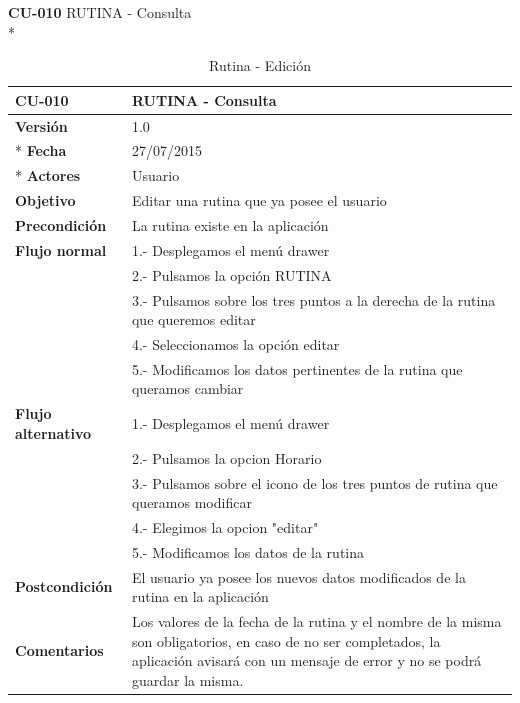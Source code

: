 \documentclass[../pfc.tex]{subfiles}
\begin{document}
		
		
		
	\textbf{CU-010}	RUTINA - Consulta\\*
		
		\begin{table}[H]
			\centering
			\begin{tabular}[t]{|p{3cm}|p{9.5cm}|}
				\hline \textbf{CU-010} & \textbf{RUTINA - Consulta} \\*
				\hline\hline \textbf{Versión} & 1.0 \\ *
				\hline\hline \textbf{Fecha} & 27/07/2015 \\ *
				\hline\textbf{Actores} 	& Usuario\\*
				\hline \textbf{Objetivo} & Editar una rutina que ya posee el usuario\\* 			
				\hline \textbf{Precondición} & La rutina existe en la aplicación\\* 
				\hline \textbf{Flujo normal} & 1.- Desplegamos el menú drawer \\* 
				& 2.- Pulsamos la opción RUTINA\\*	
				& 3.- Pulsamos sobre los tres puntos a la derecha de la rutina que queremos editar\\*	
				& 4.- Seleccionamos la opción editar\\*	
				& 5.- Modificamos los datos pertinentes de la rutina que queramos cambiar\\*	
				\hline \textbf{Flujo alternativo} & 1.- Desplegamos el menú drawer \\* 
				& 2.- Pulsamos la opcion Horario \\*	
				& 3.- Pulsamos sobre el icono de los tres puntos de rutina que queramos modificar \\*	
				& 4.- Elegimos la opcion "editar"\\*	
				& 5.- Modificamos los datos de la rutina\\*	
				\hline \textbf{Postcondición} & El usuario ya posee los nuevos datos modificados de la rutina en la aplicación \\* 
				\hline \textbf{Comentarios}   & Los valores de la fecha de la rutina y el nombre de la misma son obligatorios, en caso de no ser completados, la aplicación avisará con un mensaje de error y no se podrá guardar la misma.\\*
				\hline
			\end{tabular}
			\caption{Rutina - Edición}
			\label{tabla:caso010}
		\end{table}
		
		
		
\end{document}
